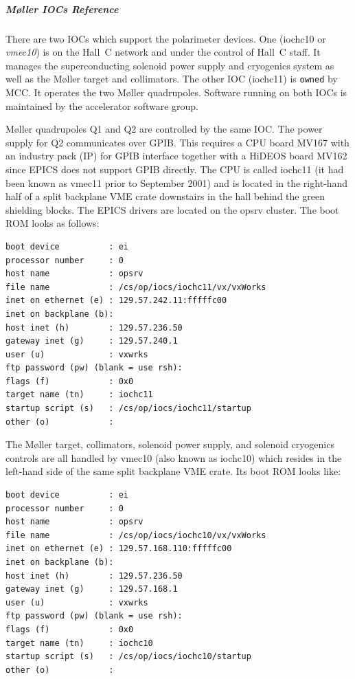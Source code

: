 \subparagraph{M\o ller IOCs Reference}

There are two IOCs which support the polarimeter devices. One
(iochc10 or {\it vmec10}) is on the Hall~C network and under the
control of Hall~C staff. It manages the superconducting solenoid
power supply and cryogenics system as well as the M\o ller target and
collimators. The other IOC (iochc11) is {\tt owned} by MCC. It
operates the two M\o ller quadrupoles. Software running on both
IOCs is maintained by the accelerator software group.

M\o ller quadrupoles Q1 and Q2 are controlled by the same IOC.
The power supply for Q2 communicates over GPIB. This requires a 
CPU board MV167 with an industry pack (IP)
for GPIB interface together with a HiDEOS board MV162 since EPICS
does not support GPIB directly. The CPU is called iochc11 (it had
been known as vmec11 prior to September 2001) and
is located in the right-hand half of a split backplane VME crate 
downstairs in the hall behind the green
shielding blocks. The EPICS drivers are located on the opsrv cluster.
The boot ROM looks as follows:

\begin{verbatim}
boot device          : ei 
processor number     : 0 
host name            : opsrv 
file name            : /cs/op/iocs/iochc11/vx/vxWorks 
inet on ethernet (e) : 129.57.242.11:fffffc00 
inet on backplane (b): 
host inet (h)        : 129.57.236.50 
gateway inet (g)     : 129.57.240.1 
user (u)             : vxwrks 
ftp password (pw) (blank = use rsh): 
flags (f)            : 0x0 
target name (tn)     : iochc11
startup script (s)   : /cs/op/iocs/iochc11/startup 
other (o)            : 
\end{verbatim}


The M\o ller target, collimators, solenoid power supply, and
solenoid cryogenics controls are all handled by vmec10 (also
known as iochc10) which resides in the left-hand side of the
same split backplane VME crate. Its boot ROM looks like:

\begin{verbatim}
boot device          : ei 
processor number     : 0 
host name            : opsrv 
file name            : /cs/op/iocs/iochc10/vx/vxWorks 
inet on ethernet (e) : 129.57.168.110:fffffc00 
inet on backplane (b): 
host inet (h)        : 129.57.236.50 
gateway inet (g)     : 129.57.168.1 
user (u)             : vxwrks 
ftp password (pw) (blank = use rsh): 
flags (f)            : 0x0 
target name (tn)     : iochc10 
startup script (s)   : /cs/op/iocs/iochc10/startup 
other (o)            : 
\end{verbatim}




